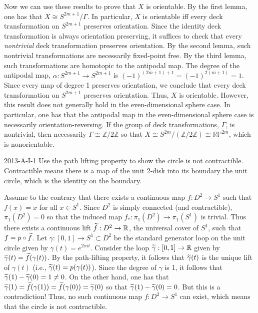 \documentclass{article}
\begin{document}
	Now we can use these results to prove that $X$ is orientable. By the first lemma, one has that $X \cong S^{2m + 1}/\Gamma$. In particular, $X$ is orientable iff every deck transformation on $S^{2m + 1}$ preserves orientation. Since the identity deck transformation is always orientation preserving, it suffices to check that every \textit{nontrivial} deck transformation preserves orientation. By the second lemma, such nontrivial transformations are necessarily fixed-point free. By the third lemma, such transformations are homotopic to the antipodal map. The degree of the antipodal map, $\alpha: S^{2m + 1} \to S^{2m + 1}$ is $(-1)^{(2m + 1) + 1} = (-1)^{2(m + 1)} = 1$. Since every map of degree 1 preserves orientation, we conclude that every deck transformation on $S^{2m + 1}$ preserves orientation. Thus, $X$ is orientable. However, this result does not generally hold in the even-dimensional sphere case. In particular, one has that the antipodal map in the even-dimensional sphere case is necessarily orientation-reversing. If the group of deck transformations, $\Gamma$, is nontrivial, then necessarily $\Gamma \cong \mathbb{Z}/2\mathbb{Z}$ so that $X \cong S^{2m}/(\mathbb{Z}/2\mathbb{Z}) \cong \mathbb{RP}^{2m}$, which is nonorientable.  
	
	\begin{prb}{2013-A-I-1}
		Use the path lifting property to show the circle is not contractible. Contractible means there is a map of the unit 2-disk into its boundary the unit circle, which is the identity on the boundary. 
	\end{prb}
	Assume to the contrary that there exists a continuous map $f: D^{2} \to S^{1}$ such that $f(x) = x$ for all $x \in S^1$. Since $D^{2}$ is simply connected (and contractible), $\pi_{1}(D^{2}) = 0$ so that the induced map $f_{\ast}: \pi_{1}(D^{2}) \to \pi_{1}(S^{1})$ is trivial. Thus there exists a continuous lift $\widetilde{f}: D^{2} \to \mathbb{R}$, the universal cover of $S^{1}$, such that $f = p \circ \widetilde{f}$. Let $\gamma: [0,1] \to S^{1} \subset D^{2}$ be the standard generator loop on the unit circle given by $\gamma(t) = e^{2\pi i t}$. Consider the loop $\widetilde{\gamma}: [0,1] \to \mathbb{R}$ given by $\widetilde{\gamma}(t) = \widetilde{f}(\gamma(t))$. By the path-lifting property, it follows that $\widetilde{\gamma}(t)$ is the unique lift of $\gamma(t)$ (i.e., $\widetilde{\gamma}(t) = p(\gamma(t))$). Since the degree of $\gamma$ is 1, it follows that $\widetilde{\gamma}(1) - \widetilde{\gamma}(0) = 1 \neq 0$. On the other hand, one has that $\widetilde{\gamma}(1) = \widetilde{f}(\gamma(1)) = \widetilde{f}(\gamma(0)) = \widetilde{\gamma}(0)$ so that $\widetilde{\gamma}(1) -\widetilde{\gamma}(0) = 0$. But this is a contradiction! Thus, no such continuous map $f: D^{2} \to S^{1}$ can exist, which means that the circle is not contractible.  
	
\end{document}
